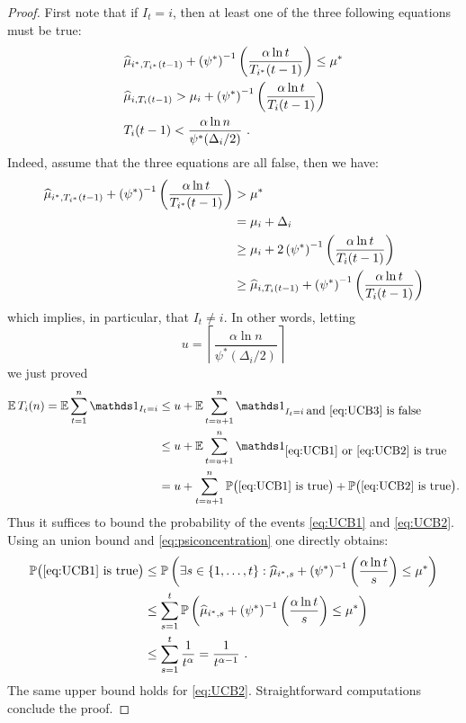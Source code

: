 \begin{proof}
First note that if $I_t = i$, then at least one of the three following equations must be true:
\begin{align}
\label{eq:UCB1}
& \widehat{\mu}_{i^*,T_{i^*}(t-1)} + \left(\psi^*\right)^{-1}\left( \frac{\alpha \ln t}{T_{i^*}(t-1)}\right) \leq \mu^*
\\
\label{eq:UCB2}
& \widehat{\mu}_{i,T_i(t-1)} > \mu_i + \left(\psi^*\right)^{-1}\left( \frac{\alpha \ln t}{T_{i}(t-1)}\right)
\\
\label{eq:UCB3}
& T_i(t-1) < \frac{\alpha \ln n}{\psi^*(\Delta_i/2)}~.
\end{align}
Indeed, assume that the three equations are all false, then we have:
\begin{align*}
\widehat{\mu}_{i^*,T_{i^*}(t-1)} + \left(\psi^*\right)^{-1}\left( \frac{\alpha \ln t}{T_{i^*}(t-1)}\right) & > \mu^* \\
& = \mu_i+\Delta_i  \\
& \geq \mu_i + 2 \left(\psi^*\right)^{-1}\left( \frac{\alpha \ln t}{T_{i}(t-1)}\right) \\
& \geq \widehat{\mu}_{i,T_i(t-1)} + \left(\psi^*\right)^{-1}\left( \frac{\alpha \ln t}{T_{i}(t-1)}\right)
\end{align*}
which implies, in particular, that $I_t \neq i$. In other words, letting
\[
    u = \left\lceil \frac{\alpha \ln n}{\psi^*(\Delta_i/2)} \right\rceil
\]
we just proved
\begin{align*}
\E\,T_i(n) = \E \sum_{t=1}^n \ds1_{I_t=i} & \leq u + \E \sum_{t=u+1}^n \ds1_{I_t = i \; \mbox{and \eqref{eq:UCB3} is false}} \\
& \leq u + \E \sum_{t=u+1}^n \ds1_{\mbox{\eqref{eq:UCB1} or \eqref{eq:UCB2} is true}} \\
& = u + \sum_{t=u+1}^n \P\bigl(\mbox{\eqref{eq:UCB1} is true}\bigr) + \P\bigl(\mbox{\eqref{eq:UCB2} is true}\bigr).
\end{align*}
Thus it suffices to bound the probability of the events \eqref{eq:UCB1} and \eqref{eq:UCB2}. Using an union bound and \eqref{eq:psiconcentration} one directly obtains:
\begin{align*}
\mathbb{P}\bigl(\mbox{\eqref{eq:UCB1} is true}\bigr) & \leq \mathbb{P}\left(\exists s \in \{1,\hdots,t\} : \widehat{\mu}_{i^*,s} + \left(\psi^*\right)^{-1}\left( \frac{\alpha \ln t}{s}\right)  \leq \mu^* \right) \\
& \leq \sum_{s=1}^t \mathbb{P}\left(\widehat{\mu}_{i^*,s} + \left(\psi^*\right)^{-1}\left( \frac{\alpha \ln t}{s}\right)  \leq \mu^* \right) \\
& \leq \sum_{s=1}^t \frac{1}{t^{\alpha}}
= \frac{1}{t^{\alpha - 1}}~. 
\end{align*}
The same upper bound holds for \eqref{eq:UCB2}. Straightforward computations conclude the proof.
\end{proof}

